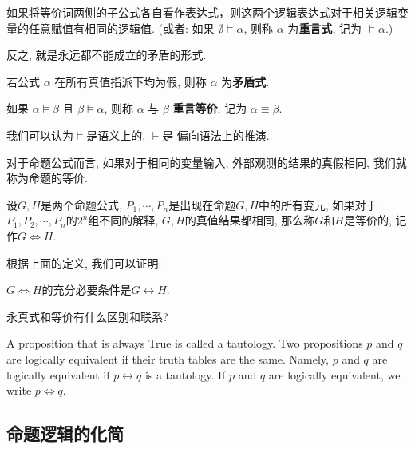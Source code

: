       \begin{definition}
        如果将等价词两侧的子公式各自看作表达式，则这两个逻辑表达式对于相关逻辑变量的任意赋值有相同的逻辑值. 
        (或者: 如果 $\emptyset \models \alpha$, 则称 $\alpha$ 为{\bf 重言式},
        记为 $\models \alpha$.)
      \end{definition}

      反之, 就是永远都不能成立的矛盾的形式. 
      
      \begin{definition}
        若公式 $\alpha$ 在所有真值指派下均为假, 则称 $\alpha$ 为{\bf 矛盾式}. 
      \end{definition}

      \begin{definition}
        如果 $\alpha \models \beta$ 且 $\beta \models \alpha$,
        则称 $\alpha$ 与 $\beta$ {\bf 重言等价}, 记为 $\alpha \equiv \beta$. 
      \end{definition}
      
      我们可以认为$\models$是语义上的, $\vdash$是 	偏向语法上的推演. 
      
     对于命题公式而言, 如果对于相同的变量输入, 外部观测的结果的真假相同, 我们就称为命题的等价. 
     
     \begin{definition}[命题的等价]
     	设$G,H$是两个命题公式, $P_1,\cdots, P_n$是出现在命题$G,H$中的所有变元, 如果对于$P_1,P_2,\cdots,P_n$的$2^n$组不同的解释, $G,H$的真值结果都相同, 那么称$G$和$H$是等价的, 记作$G\Leftrightarrow H$. 
     \end{definition}      
     根据上面的定义, 我们可以证明: 
     \begin{theorem}
     	$G\Leftrightarrow H$的充分必要条件是$G\leftrightarrow H$. 
     \end{theorem}
     
     \begin{bonus}
     	永真式和等价有什么区别和联系? 
     	
     	A proposition that is always True is called a tautology. Two propositions $p$ and $q$ are logically equivalent if their truth tables are the same. Namely, $p$ and $q$ are logically equivalent if $p \leftrightarrow q$ is a tautology. If $p$ and $q$ are logically equivalent, we write $p \Leftrightarrow q$.
     \end{bonus}
      
\subsection{命题逻辑的化简}

